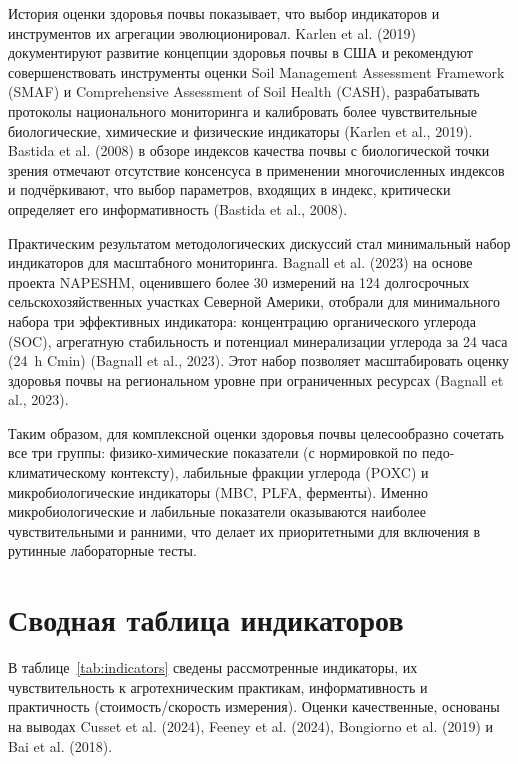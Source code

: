 \documentclass[11pt,a4paper]{article}
\begin{document}
История оценки здоровья почвы показывает, что выбор индикаторов и инструментов
их агрегации эволюционировал. Karlen et al. (2019) документируют развитие
концепции здоровья почвы в США и рекомендуют совершенствовать инструменты
оценки Soil Management Assessment Framework (SMAF) и Comprehensive Assessment
of Soil Health (CASH), разрабатывать протоколы национального мониторинга и
калибровать более чувствительные биологические, химические и физические
индикаторы (Karlen et al., 2019). Bastida et al. (2008) в обзоре индексов качества
почвы с биологической точки зрения отмечают отсутствие консенсуса в
применении многочисленных индексов и подчёркивают, что выбор параметров,
входящих в индекс, критически определяет его информативность
(Bastida et al., 2008).

Практическим результатом методологических дискуссий стал минимальный набор
индикаторов для масштабного мониторинга. Bagnall et al. (2023) на основе
проекта NAPESHM, оценившего более 30 измерений на 124 долгосрочных
сельскохозяйственных участках Северной Америки, отобрали для минимального
набора три эффективных индикатора: концентрацию органического углерода (SOC),
агрегатную стабильность и потенциал минерализации углерода за 24 часа (24~h
Cmin) (Bagnall et al., 2023). Этот набор позволяет масштабировать оценку здоровья
почвы на региональном уровне при ограниченных ресурсах (Bagnall et al., 2023).

Таким образом, для комплексной оценки здоровья почвы целесообразно сочетать
все три группы: физико-химические показатели (с нормировкой по
педо-климатическому контексту), лабильные фракции углерода (POXC) и
микробиологические индикаторы (MBC, PLFA, ферменты). Именно микробиологические
и лабильные показатели оказываются наиболее чувствительными и ранними, что
делает их приоритетными для включения в рутинные лабораторные тесты.

\section{Сводная таблица индикаторов}
\label{sec:table}

В таблице~\ref{tab:indicators} сведены рассмотренные индикаторы, их
чувствительность к агротехническим практикам, информативность и практичность
(стоимость/скорость измерения). Оценки качественные, основаны на выводах
Cusset et al. (2024), Feeney et al. (2024), Bongiorno et al. (2019) и Bai et al. (2018).
\end{document}
